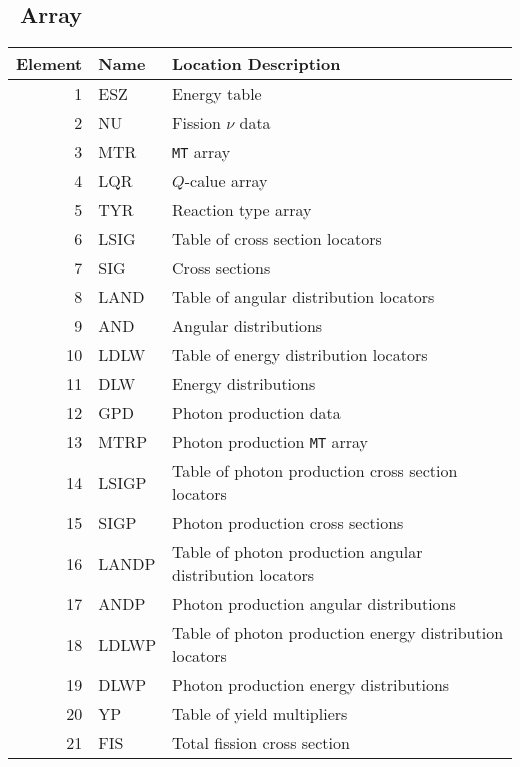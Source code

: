 
\subsection{\JXS\ Array}\label{sec:JXSContinuousEnergyNeutron}
\begin{table} \centering
  \begin{tabular}{rll}
    \toprule
    Element  & Name   & Location Description \\
    \midrule
    1        & ESZ    & Energy table \\
    2        & NU     & Fission $\nu$ data \\
    3        & MTR    & \texttt{MT} array \\
    4        & LQR    & $Q$-calue array \\
    5        & TYR    & Reaction type array \\
    6        & LSIG   & Table of cross section locators \\
    7        & SIG    & Cross sections \\
    8        & LAND   & Table of angular distribution locators \\
    9        & AND    & Angular distributions \\
    10       & LDLW   & Table of energy distribution locators \\
    11       & DLW    & Energy distributions \\
    12       & GPD    & Photon production data \\
    13       & MTRP   & Photon production \texttt{MT} array \\
    14       & LSIGP  & Table of photon production cross section locators \\
    15       & SIGP   & Photon production cross sections \\
    16       & LANDP  & Table of photon production angular distribution locators \\
    17       & ANDP   & Photon production angular distributions \\
    18       & LDLWP  & Table of photon production energy distribution locators \\
    19       & DLWP   & Photon production energy distributions \\
    20       & YP     & Table of yield multipliers \\
    21       & FIS    & Total fission cross section \\

\end{tabular}
\end{table}
